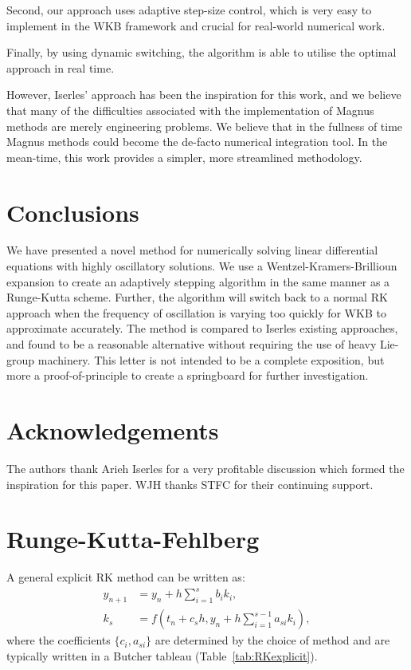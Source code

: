 Second, our approach uses adaptive step-size control, which is very easy to implement in the WKB framework and crucial for real-world numerical work.

Finally, by using dynamic switching, the algorithm is able to utilise the optimal approach in real time.

However, Iserles' approach has been the inspiration for this work, and we believe that many of the difficulties associated with the implementation of Magnus methods are merely engineering problems. We believe that in the fullness of time Magnus methods could become the de-facto numerical integration tool. In the mean-time, this work provides a simpler, more streamlined methodology.


\section{Conclusions}



We have presented a novel method for numerically solving linear differential equations with highly oscillatory solutions. We use a Wentzel-Kramers-Brillioun expansion to create an adaptively stepping algorithm in the same manner as a Runge-Kutta scheme. Further, the algorithm will switch back to a normal RK approach when the frequency of oscillation is varying too quickly for WKB to approximate accurately. The method is compared to Iserles existing approaches, and found to be a reasonable alternative without requiring the use of heavy Lie-group machinery. This letter is not intended to be a complete exposition, but more a proof-of-principle to create a springboard for further investigation.

\section*{Acknowledgements}
The authors thank Arieh Iserles for a very profitable discussion which formed the inspiration for this paper. WJH thanks STFC for their continuing support.


\section{Runge-Kutta-Fehlberg}
\label{sec:rkf}

A general explicit RK method can be written as:
\begin{align}
  y_{n+1} &= y_n + h\sum\limits_{i=1}^{s} b_i k_i, \label{eqn:rk_step} \\
  k_s &= f(t_n + c_s h, y_n + h \sum\limits_{i=1}^{s-1}a_{si} k_i),
\end{align}
where the coefficients $\{c_i,a_{si}\}$ are determined by the choice of method and are typically written in a Butcher tableau (Table~\ref{tab:RKexplicit}). 

